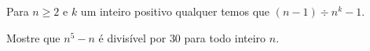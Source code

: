 \begin{exercise}
    Para $n \ge 2$ e $k$ um inteiro positivo qualquer temos que $(n-1) \div n^k - 1$.
\end{exercise}

\begin{exercise}
    Mostre que $n^5 - n$ é divisível por $30$ para todo inteiro $n$.
\end{exercise}